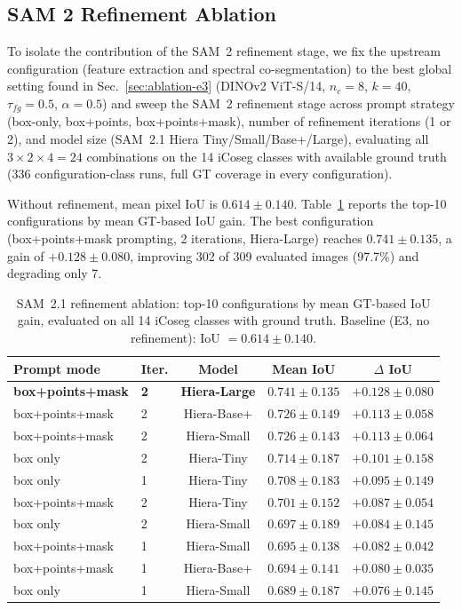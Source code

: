 \subsection{SAM 2 Refinement Ablation}
\label{sec:ablation-e4}

To isolate the contribution of the SAM~2 refinement stage, we fix the
upstream configuration (feature extraction and spectral
co-segmentation) to the best global setting found in
Sec.~\ref{sec:ablation-e3} (DINOv2 ViT-S/14, $n_c{=}8$, $k{=}40$,
$\tau_{fg}{=}0.5$, $\alpha{=}0.5$) and sweep the SAM~2 refinement
stage across prompt strategy (box-only, box+points, box+points+mask),
number of refinement iterations (1 or 2), and model size (SAM~2.1
Hiera Tiny/Small/Base+/Large), evaluating all $3\times2\times4=24$
combinations on the 14 iCoseg classes with available ground truth
(336 configuration-class runs, full GT coverage in every
configuration).

Without refinement, mean pixel IoU is $0.614 \pm 0.140$. Table~\ref{tab:ablation-e4}
reports the top-10 configurations by mean GT-based IoU gain. The best
configuration (box+points+mask prompting, 2 iterations, Hiera-Large)
reaches $0.741 \pm 0.135$, a gain of $+0.128 \pm 0.080$, improving
302 of 309 evaluated images (97.7\%) and degrading only 7.

\begin{table}[t]
\centering
\caption{SAM~2.1 refinement ablation: top-10 configurations by mean
GT-based IoU gain, evaluated on all 14 iCoseg classes with ground
truth. Baseline (E3, no refinement): IoU $= 0.614 \pm 0.140$.}
\label{tab:ablation-e4}
\begin{tabular}{@{}llccc@{}}
\toprule
Prompt mode & Iter. & Model & Mean IoU & $\Delta$ IoU \\
\midrule
\textbf{box+points+mask} & \textbf{2} & \textbf{Hiera-Large} & $\mathbf{0.741\pm0.135}$ & $\mathbf{+0.128\pm0.080}$ \\
box+points+mask & 2 & Hiera-Base+ & $0.726\pm0.149$ & $+0.113\pm0.058$ \\
box+points+mask & 2 & Hiera-Small & $0.726\pm0.143$ & $+0.113\pm0.064$ \\
box only        & 2 & Hiera-Tiny  & $0.714\pm0.187$ & $+0.101\pm0.158$ \\
box only        & 1 & Hiera-Tiny  & $0.708\pm0.183$ & $+0.095\pm0.149$ \\
box+points+mask & 2 & Hiera-Tiny  & $0.701\pm0.152$ & $+0.087\pm0.054$ \\
box only        & 2 & Hiera-Small & $0.697\pm0.189$ & $+0.084\pm0.145$ \\
box+points+mask & 1 & Hiera-Small & $0.695\pm0.138$ & $+0.082\pm0.042$ \\
box+points+mask & 1 & Hiera-Base+ & $0.694\pm0.141$ & $+0.080\pm0.035$ \\
box only        & 1 & Hiera-Small & $0.689\pm0.187$ & $+0.076\pm0.145$ \\
\bottomrule
\end{tabular}
\end{table}

